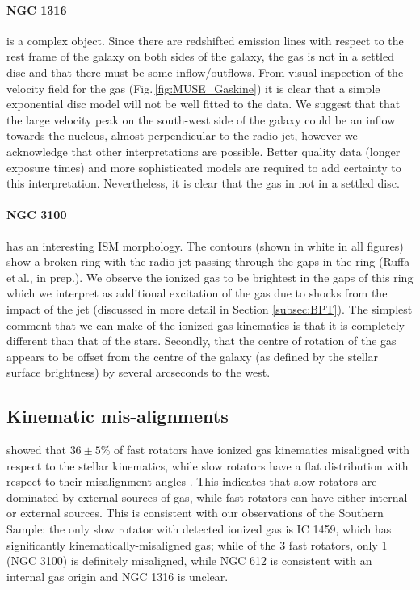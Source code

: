 	\paragraph{NGC 1316} is a complex object. Since there are redshifted emission lines with respect to the rest frame of the galaxy on both sides of the galaxy, the gas is not in a settled disc and that there must be some inflow/outflows. From visual inspection of the velocity field for the gas (Fig.\,\ref{fig:MUSE_Gaskine}) it is clear that a simple exponential disc model will not be well fitted to the data. We suggest that that the large velocity peak on the south-west side of the galaxy could be an inflow towards the nucleus, almost perpendicular to the radio jet, however we acknowledge that other interpretations are possible. Better quality data (longer exposure times) and more sophisticated models are required to add certainty to this interpretation. Nevertheless, it is clear that the gas in not in a settled disc. 


	\paragraph{NGC 3100} has an interesting ISM morphology. The  contours (shown in white in all figures) show a broken ring with the radio jet passing through the gaps in the ring (Ruffa et\,al., in prep.). We observe the ionized gas to be brightest in the gaps of this ring which we interpret as additional excitation of the gas due to shocks from the impact of the jet (discussed in more detail in Section \ref{subsec:BPT}). The simplest comment that we can make of the ionized gas kinematics is that it is completely different than that of the stars. Secondly, that the centre of rotation of the gas appears to be offset from the centre of the galaxy (as defined by the stellar surface brightness) by several arcseconds to the west. 

	\subsection{Kinematic mis-alignments}
		\citet{Davis2011a} showed that $36\pm5$\% of fast rotators have ionized gas kinematics misaligned with respect to the stellar kinematics, while slow rotators have a flat distribution with respect to their misalignment angles \citep[see fig.\ 4]{Davis2011a}. This indicates that slow rotators are dominated by external sources of gas, while fast rotators can have either internal or external sources. This is consistent with our observations of the Southern Sample: the only slow rotator with detected ionized gas is IC 1459, which has significantly kinematically-misaligned gas; while of the 3 fast rotators, only 1 (NGC 3100) is definitely misaligned, while NGC 612 is consistent with an internal gas origin and NGC 1316 is unclear.

